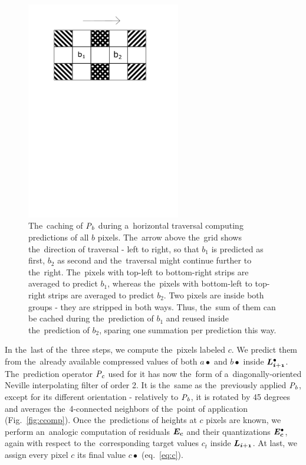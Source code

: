 \begin{figure}
	\includegraphics[trim={0 19cm 0cm 1cm}, clip, width=0.6\textwidth]{figures/bcaching.pdf}\centering
	\caption{The~caching of $\mathit{P_{b}}$ during a~horizontal traversal computing predictions of all $b$ pixels. The~arrow above the~grid shows the~direction of traversal - left to right, so that $b_1$ is predicted as first, $b_2$ as second and the~traversal might continue further to the~right. The~pixels with top-left to bottom-right strips are averaged to predict $b_1$, whereas the~pixels with bottom-left to top-right strips are averaged to predict $b_2$. Two pixels are inside both groups - they are stripped in both ways. Thus, the~sum of them can be cached during the~prediction of $b_1$ and reused inside the~prediction of $b_2$, sparing one summation per prediction this way.}
	\label{fig:bcaching}
\end{figure}

In the~last of the~three steps, we compute the~pixels labeled $c$. We predict them from the~already available compressed values of both $a\bullet$ and $b\bullet$ inside $\ldot{i+1}$. The~prediction operator $\mathit{P_{c}}$ used for it has now the~form of a~diagonally-oriented Neville interpolating filter of order 2. It is the~same as the~previously applied $\mathit{P_{b}}$, except for its different orientation - relatively to $\mathit{P_{b}}$, it is rotated by 45 degrees and averages the~4-connected neighbors of the~point of application (Fig.~\ref{fig:ccomp}). Once the~predictions of heights at $c$ pixels are known, we perform an~analogic computation of residuals $\objnorm{E}{c}$ and their quantizations $\objdot{E}{c}$, again with respect to the~corresponding target values $c_t$ inside $\lnorm{i+1}$. At last, we assign every pixel $c$ its final value $c\bullet$ (eq.~\ref{eq:c}).

